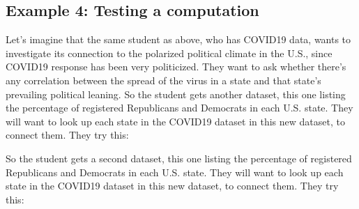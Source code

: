 \documentclass[letterpaper,10pt,english]{jupyterBook}
\begin{document}
\subsection{Example 4: Testing a computation}
\label{\detokenize{chapter-7-abstraction:example-4-testing-a-computation}}
\sphinxAtStartPar
Let’s imagine that the same student as above, who has COVID\sphinxhyphen{}19 data, wants to investigate its connection to the polarized political climate in the U.S., since COVID\sphinxhyphen{}19 response has been very politicized. They want to ask whether there’s any correlation between the spread of the virus in a state and that state’s prevailing political leaning. So the student gets another dataset, this one listing the percentage of registered Republicans and Democrats in each U.S. state. They will want to look up each state in the COVID\sphinxhyphen{}19 dataset in this new dataset, to connect them. They try this:

\sphinxAtStartPar
So the student gets a second dataset, this one listing the percentage of registered Republicans and Democrats in each U.S. state.  They will want to look up each state in the COVID\sphinxhyphen{}19 dataset in this new dataset, to connect them.  They try this:

\begin{sphinxVerbatim}[commandchars=\\\{\}]
   
   
                                  

    \PYG{p}{[}\PYG{p}{]} \PYG{p}{[}\PYG{p}{]}  
    \PYG{p}{[}\PYG{p}{]} \PYG{p}{[}\PYG{p}{]}  

\PYG{p}{[}\PYG{p}{]}
\end{sphinxVerbatim}
\end{document}
